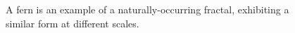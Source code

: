 \begin{figure}[bt]
	\centering
	\captionsetup[subfloat]{labelformat=empty}
	\hspace{0.3cm}
	\hspace{0.3cm}
	\caption{A fern is an example of a naturally-occurring fractal, exhibiting a similar form at different scales.}
	\label{fig:FractalFern}
\end{figure}

